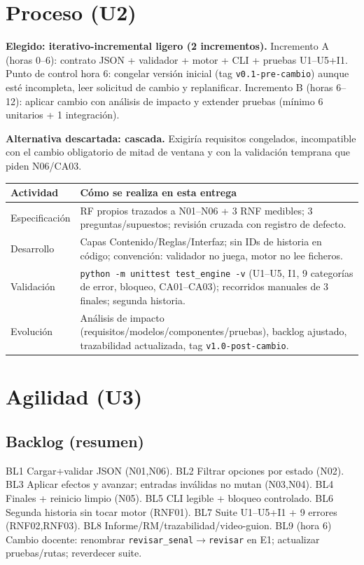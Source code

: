\documentclass[11pt,a4paper]{article}
\begin{document}
\section{Proceso (U2)}
\textbf{Elegido: iterativo-incremental ligero (2 incrementos).} Incremento A (horas 0--6): contrato JSON + validador + motor + CLI + pruebas U1--U5+I1. Punto de control hora 6: congelar versi\'on inicial (tag \texttt{v0.1-pre-cambio}) aunque est\'e incompleta, leer solicitud de cambio y replanificar. Incremento B (horas 6--12): aplicar cambio con an\'alisis de impacto y extender pruebas (m\'inimo 6 unitarios + 1 integraci\'on).

\textbf{Alternativa descartada: cascada.} Exigir\'ia requisitos congelados, incompatible con el cambio obligatorio de mitad de ventana y con la validaci\'on temprana que piden N06/CA03.

\begin{center}
\small\begin{tabular}{p{2.6cm}p{11.5cm}}
\toprule Actividad & C\'omo se realiza en esta entrega \\
\midrule Especificaci\'on & RF propios trazados a N01--N06 + 3 RNF medibles; 3 preguntas/supuestos; revisi\'on cruzada con registro de defecto. \\
Desarrollo & Capas Contenido/Reglas/Interfaz; sin IDs de historia en c\'odigo; convenci\'on: validador no juega, motor no lee ficheros. \\
Validaci\'on & \texttt{python -m unittest test\_engine -v} (U1--U5, I1, 9 categor\'ias de error, bloqueo, CA01--CA03); recorridos manuales de 3 finales; segunda historia. \\
Evoluci\'on & An\'alisis de impacto (requisitos/modelos/componentes/pruebas), backlog ajustado, trazabilidad actualizada, tag \texttt{v1.0-post-cambio}. \\
\bottomrule
\end{tabular}
\end{center}

\section{Agilidad (U3)}
\subsection{Backlog (resumen)}
BL1 Cargar+validar JSON (N01,N06). BL2 Filtrar opciones por estado (N02). BL3 Aplicar efectos y avanzar; entradas inv\'alidas no mutan (N03,N04). BL4 Finales + reinicio limpio (N05). BL5 CLI legible + bloqueo controlado. BL6 Segunda historia sin tocar motor (RNF01). BL7 Suite U1--U5+I1 + 9 errores (RNF02,RNF03). BL8 Informe/RM/trazabilidad/video-guion. BL9 (hora 6) Cambio docente: renombrar \texttt{revisar\_senal}$\to$\texttt{revisar} en E1; actualizar pruebas/rutas; reverdecer suite.
\end{document}
